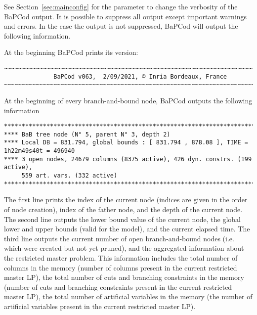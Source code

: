 \documentclass[10pt,a4paper]{article}
\newcommand{\bc}{BaPCod\xspace}
\begin{document}
See Section~\ref{sec:mainconfig} for the parameter to change the verbosity of the \bc output. It is possible to suppress
all output except important warnings and errors. In the case the output is not suppressed, \bc will output the following
information. 

\medskip  At the beginning \bc prints its version:
\footnotesize
\begin{verbatim}
~~~~~~~~~~~~~~~~~~~~~~~~~~~~~~~~~~~~~~~~~~~~~~~~~~~~~~~~~~~~~~~~~~~~~~~~~~~~
              BaPCod v063,  2/09/2021, © Inria Bordeaux, France
~~~~~~~~~~~~~~~~~~~~~~~~~~~~~~~~~~~~~~~~~~~~~~~~~~~~~~~~~~~~~~~~~~~~~~~~~~~~
\end{verbatim}
\normalsize 

\medskip At the beginning of every branch-and-bound node, \bc outputs the following information
\scriptsize
\begin{verbatim}
********************************************************************************************
**** BaB tree node (N° 5, parent N° 3, depth 2)
**** Local DB = 831.794, global bounds : [ 831.794 , 878.08 ], TIME = 1h22m49s40t = 496940
**** 3 open nodes, 24679 columns (8375 active), 426 dyn. constrs. (199 active), 
     559 art. vars. (332 active)
********************************************************************************************
\end{verbatim}
\normalsize The first line prints the index of the current node (indices are given in the order of node creation), index
of the father node, and the depth of the current node. The second line outputs the lower bound value of the current
node, the global lower and upper bounds (valid for the model), and the current elapsed time. The third line outputs the
current number of open branch-and-bound nodes (i.e. which were created but not yet pruned), and the aggregated
information about the restricted master problem. This information includes the total number of columns in the memory
(number of columns present in the current restricted master LP), the total number of cuts and branching constraints in
the memory (number of cuts and branching constraints present in the current restricted master LP), the total number of
artificial variables in the memory (the number of artificial variables present in the current restricted master LP). 
\end{document}
